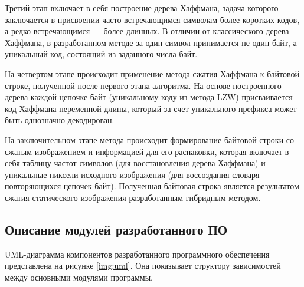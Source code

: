 Третий этап включает в себя построение дерева Хаффмана, задача которого заключается в присвоении часто встречающимся символам более коротких кодов, а редко встречающимся --- более длинных. В отличии от классического дерева Хаффмана, в разработанном методе за один символ принимается не один байт, а уникальный код, состоящий из заданного числа байт.

На четвертом этапе происходит применение метода сжатия Хаффмана к байтовой строке, полученной после первого этапа алгоритма. На основе построенного дерева каждой цепочке байт (уникальному коду из метода LZW) присваивается код Хаффмана переменной длины, который за счет уникального префикса может быть однозначно декодирован.

На заключительном этапе метода происходит формирование байтовой строки со сжатым изображением и информацией для его распаковки, которая включает в себя таблицу частот символов (для восстановления дерева Хаффмана) и уникальные пиксели исходного изображения (для воссоздания словаря повторяющихся цепочек байт). Полученная байтовая строка является результатом сжатия статического изображения разработанным гибридным методом.

\subsection{Описание модулей разработанного ПО}

UML-диаграмма компонентов разработанного программного обеспечения представлена на рисунке \ref{img:uml}. Она показывает структору зависимостей между основными модулями программы.


